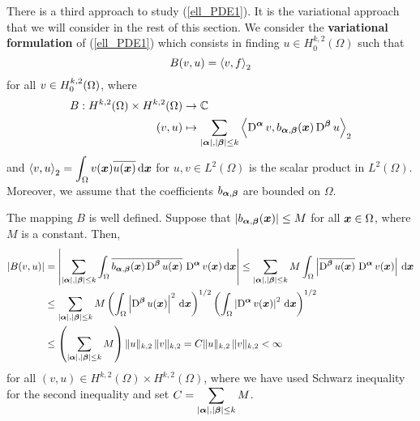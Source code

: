 There is a third approach to study (\ref{ell_PDE1}).  It is the
variational approach that we will consider in the rest of this
section.  We consider the {\bfseries variational formulation} of
(\ref{ell_PDE1}) which consists in finding
$\displaystyle u\in H^{k,2}_0(\Omega)$ such that
\begin{equation} \label{ell_PDE2}
B(v,u) = \left\langle{v} , {f}\right\rangle_2
\end{equation}
for all $\displaystyle \displaystyle v \in H^{k,2}_0(\Omega)$, where
\begin{equation} \label{ell_PDE3}
\begin{split}
B : H^{k,2}(\Omega) \times H^{k,2}(\Omega) & \rightarrow \mathbb{C} \\
(v,u) &\mapsto
\sum_{|{\bm{\alpha}}|,|{\bm{\beta}}|\leq k}
\left\langle{\operatorname{D}^{{\bm{\alpha}}} v} , {b_{{\bm{\alpha}},{\bm{\beta}}}({\bm{x}})
\operatorname{D}^{{\bm{\beta}}} u}\right\rangle_2
\end{split}
\end{equation}
and $\displaystyle \left\langle{v} , {u}\right\rangle_2
= \int_\Omega v({\bm{x}})\overline{u({\bm{x}})} \,\mathrm{d}{{\bm{x}}}$
for $\displaystyle u,v \in L^2(\Omega)$ is the scalar product in
$\displaystyle L^2(\Omega)$.  Moreover, we assume that the
coefficients $b_{{\bm{\alpha}},{\bm{\beta}}}$ are bounded on $\Omega$.

The mapping $B$ is well defined.  Suppose that
$\left| b_{{\bm{\alpha}},{\bm{\beta}}}({\bm{x}})\right| \leq M$ for all 
${\bm{x}}\in \Omega$, where $M$ is a constant.  Then,
\begin{align*}
\left| B(v,u) \right| &=
\left| \sum_{|{\bm{\alpha}}|,|{\bm{\beta}}|\leq k}
\int_\Omega \overline{b_{{\bm{\alpha}},{\bm{\beta}}}({\bm{x}})
\operatorname{D}^{{\bm{\beta}}} u({\bm{x}})}\,
\operatorname{D}^{{\bm{\alpha}}} v({\bm{x}}) \,\mathrm{d}{{\bm{x}}} \right|
\leq \sum_{|{\bm{\alpha}}|,|{\bm{\beta}}|\leq k} M
\int_\Omega \left| \overline{\operatorname{D}^{{\bm{\beta}}} u({\bm{x}})}\,
\operatorname{D}^{{\bm{\alpha}}} v({\bm{x}})\right| \,\mathrm{d}{{\bm{x}}} \\
&\leq \sum_{|{\bm{\alpha}}|,|{\bm{\beta}}|\leq k} M
\left( \int_\Omega \left|\operatorname{D}^{{\bm{\beta}}} u({\bm{x}})\right|^2
\,\mathrm{d}{{\bm{x}}}\right)^{1/2}
\left( \int_\Omega \left|\operatorname{D}^{{\bm{\alpha}}} v({\bm{x}})\right|^2
\,\mathrm{d}{{\bm{x}}}\right)^{1/2} \\
&\leq \left(\sum_{|{\bm{\alpha}}|,|{\bm{\beta}}|\leq k} M \right)
\| u\|_{k,2}\, \| v\|_{k,2}
= C \| u\|_{k,2} \, \| v\|_{k,2} < \infty
\end{align*}
for all $\displaystyle (v,u) \in H^{k,2}(\Omega) \times H^{k,2}(\Omega)$,
where we have used Schwarz inequality for the second inequality and
set $\displaystyle C = \sum_{|{\bm{\alpha}}|,|{\bm{\beta}}|\leq k} M $.

